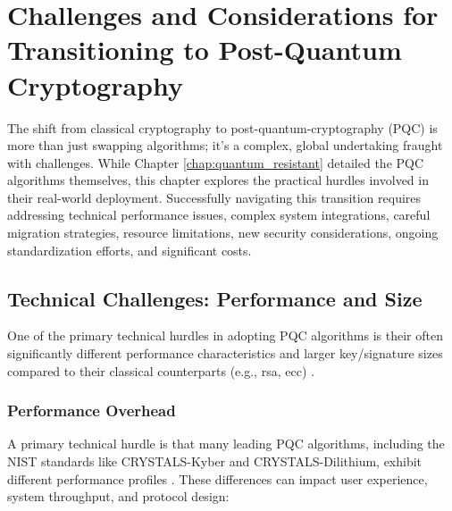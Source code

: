 \chapter{Challenges and Considerations for Transitioning to Post-Quantum Cryptography}\label{chap:challenges_ch7}\label{chap:challenges}

The shift from classical cryptography to \gls{post-quantum-cryptography} (PQC) is more than just swapping algorithms; it's a complex, global undertaking fraught with challenges. While Chapter \ref{chap:quantum_resistant} detailed the PQC algorithms themselves, this chapter explores the practical hurdles involved in their real-world deployment. Successfully navigating this transition requires addressing technical performance issues, complex system integrations, careful migration strategies, resource limitations, new security considerations, ongoing standardization efforts, and significant costs.

\section{Technical Challenges: Performance and Size}\label{sec:technical_challenges_ch7_rev}
One of the primary technical hurdles in adopting PQC algorithms is their often significantly different performance characteristics and larger key/signature sizes compared to their classical counterparts (e.g., \gls{rsa}, \gls{ecc}) \parencite{pqc_performance_benchmarking_2023}.

\subsection{Performance Overhead}\label{subsec:performance_ch7_rev}
A primary technical hurdle is that many leading PQC algorithms, including the NIST standards like CRYSTALS-Kyber and CRYSTALS-Dilithium, exhibit different performance profiles \parencite{bernstein2017post}. These differences can impact user experience, system throughput, and protocol design:

